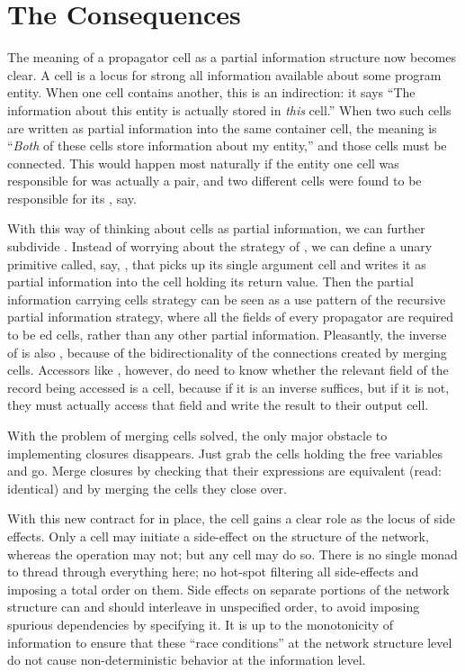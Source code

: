 \documentclass[12pt,letterpaper]{article}
\begin{document}
\section{The Consequences}

The meaning of a propagator cell as a partial information structure
now becomes clear.  A cell is a locus for strong all information
available about some program entity.  When one cell contains another,
this is an indirection: it says ``The information about this entity is
actually stored in \emph{this} cell.''  When two such cells are
written as partial information into the same container cell, the
meaning is ``\emph{Both} of these cells store information about my
entity,'' and those cells must be connected.  This would happen most
naturally if the entity one cell was responsible for was actually a
pair, and two different cells were found to be responsible for its
, say.

With this way of thinking about cells as partial information, we can
further subdivide .  Instead of worrying about the strategy
of , we can define a unary primitive called, say,
, that picks up its single argument cell and writes it
as partial information into the cell holding its return value.  Then
the partial information carrying cells strategy can be seen as a use
pattern of the recursive partial information strategy, where all the
fields of every  propagator are required to be
ed cells, rather than any other partial information.
Pleasantly, the inverse of  is also ,
because of the bidirectionality of the connections created by merging
cells.  Accessors like , however, do need to know whether
the relevant field of the record being accessed is a cell, because if
it is an inverse  suffices, but if it is not, they must
actually access that field and write the result to their output cell.

With the problem of merging cells solved, the only major obstacle to
implementing closures disappears.  Just grab the cells holding the
free variables and go.  Merge closures by checking that their
expressions are equivalent (read: identical) and by merging the cells
they close over.

With this new contract for  in place, the cell gains a
clear role as the locus of side effects.  Only a cell may initiate a
side-effect on the structure of the network, whereas the 
operation may not; but any cell may do so.  There is no single
 monad to thread through everything here; no hot-spot
filtering all side-effects and imposing a total order on them.  Side
effects on separate portions of the network structure can and should
interleave in unspecified order, to avoid imposing spurious
dependencies by specifying it.  It is up to the monotonicity of
information to ensure that these ``race conditions'' at the network
structure level do not cause non-deterministic behavior at the
information level.
\end{document}
